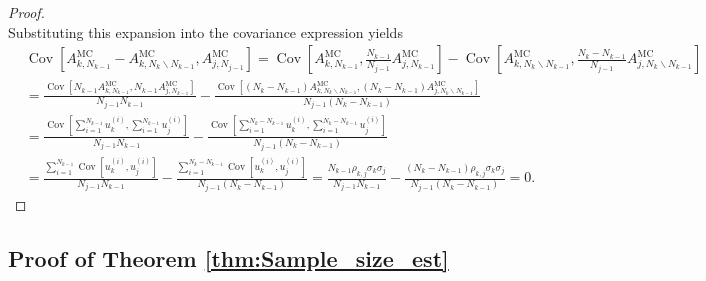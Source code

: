 \begin{proof}
\begin{equation*}
\end{equation*}
%
Substituting this expansion into the covariance expression yields
%
\begin{align*}
    &\operatorname{Cov}\left[A_{k,N_{k-1}}^{\text{MC}} - A_{k,N_{k}\backslash N_{k-1}}^{\text{MC}}, A_{j,N_{j-1}}^{\text{MC}}\right]
    =\operatorname{Cov}\left[A_{k,N_{k-1}}^{\text{MC}}, \frac{N_{k-1}}{N_{j-1}}A_{j,N_{k-1}}^{\text{MC}}\right]-\operatorname{Cov}\left[ A_{k,N_{k}\backslash N_{k-1}}^{\text{MC}}, \frac{N_k - N_{k-1}}{N_{j-1}} A_{j,N_{k}\backslash N_{k-1}}^{\text{MC}} \right]\\
    &=\frac{\operatorname{Cov}\left[N_{k-1}A_{k,N_{k-1}}^{\text{MC}}, N_{k-1} A_{j,N_{k-1}}^{\text{MC}}\right]}{N_{j-1}N_{k-1}}-\frac{\operatorname{Cov}\left[(N_k-N_{k-1}) A_{k,N_{k}\backslash N_{k-1}}^{\text{MC}}, (N_k - N_{k-1}) A_{j,N_{k}\backslash N_{k-1}}^{\text{MC}} \right]}{N_{j-1}(N_k-N_{k-1})}\\
    &=\frac{\operatorname{Cov}\left[\sum_{i=1}^{N_{k-1}}u_{k}^{(i)},\sum_{i=1}^{N_{k-1}}u_{j}^{(i)}\right]}{N_{j-1}N_{k-1}}
    -\frac{\operatorname{Cov}\left[\sum_{i=1}^{N_k-N_{k-1}}u_{k}^{(i)}, \sum_{i=1}^{N_k-N_{k-1}}u_{j}^{(i)}\right]}{N_{j-1}(N_k-N_{k-1})}\\
    &=\frac{\sum_{i=1}^{N_{k-1}}\operatorname{Cov}\left[u_{k}^{(i)},u_{j}^{(i)}\right]}{N_{j-1}N_{k-1}} -\frac{\sum_{i=1}^{N_k-N_{k-1}}\operatorname{Cov}\left[u_{k}^{(i)}, u_{j}^{(i)}\right]}{N_{j-1}(N_k-N_{k-1})}=\frac{N_{k-1}\rho_{k,j}\sigma_k\sigma_j}{N_{j-1}N_{k-1}}-\frac{(N_k-N_{k-1})\rho_{k,j}\sigma_k\sigma_j}{N_{j-1}(N_k-N_{k-1})}=0.
\end{align*}
\end{proof}

\subsection{Proof of Theorem \ref{thm:Sample_size_est}}

